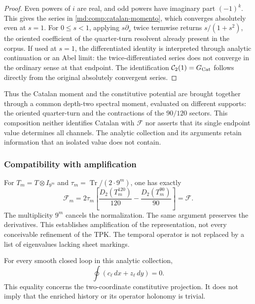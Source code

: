 \begin{proof}
Even powers of \(i\) are real, and odd powers have imaginary part
\((-1)^k\). This gives the series in
\eqref{md:comp:catalan-momento}, which converges absolutely even at
\(s=1\). For \(0\leq s<1\), applying \(s\partial_s\) twice termwise
returns \(s/(1+s^2)\), the oriented coefficient of the quarter-turn
resolvent already present in the corpus.
If used at \(s=1\), the differentiated identity is interpreted through
analytic continuation or an Abel limit: the twice-differentiated series
does not converge in the ordinary sense at that endpoint.
The identification \(\mathcal C_2(1)=G_{\rm Cat}\) follows directly
from the original absolutely convergent series.
\end{proof}

Thus the Catalan moment and the constitutive potential are brought
together through a common depth-two spectral moment, evaluated on
different supports: the oriented quarter-turn and the contractions of
the \(90/120\) sectors. This composition neither identifies Catalan
with \(\mathscr F\) nor asserts that its single endpoint value determines
all channels. The analytic collection and its arguments retain information
that an isolated value does not contain.

\subsubsection{Compatibility with amplification}
\label{md:comp:amplificacion-potencial}

For \(T_m=T\otimes I_{9^m}\) and
\(\tau_m=\operatorname{Tr}/(2\cdot9^m)\), one has exactly
\begin{equation}
 \mathscr F_m=2\tau_m\left[
 \frac{D_2(T_m^{120})}{120}
 -\frac{D_2(T_m^{90})}{90}\right]=\mathscr F.
 \label{md:comp:potencial-amplificado}
\end{equation}
The multiplicity \(9^m\) cancels the normalization. The same argument
preserves the derivatives. This establishes amplification of the
representation, not every conceivable refinement of the TPK.
The temporal operator is not replaced by a list of eigenvalues lacking
sheet markings.

For every smooth closed loop in this analytic collection,
\begin{equation}
 \oint(c_\ell\,dx+z_\ell\,dy)=0.
 \label{md:comp:integral-cerrada}
\end{equation}
This equality concerns the two-coordinate constitutive projection.
It does not imply that the enriched history or its operator holonomy
is trivial.

